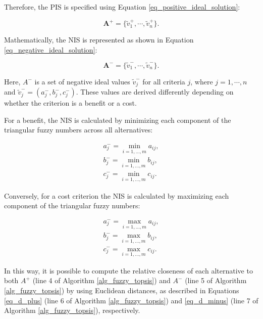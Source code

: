 \documentclass[iicol]{sn-jnl}
\begin{document}
Therefore, the PIS is specified using Equation \eqref{eq_positive_ideal_solution}:

\begin{equation}\label{eq_positive_ideal_solution}
    \mathbf{A^+} = \{ \tilde{v}^+_1, \cdots, \tilde{v}^+_n \}.
\end{equation}

Mathematically, the NIS is represented as shown in Equation \eqref{eq_negative_ideal_solution}:

\begin{equation}\label{eq_negative_ideal_solution}
    \mathbf{A^-} = \{ \tilde{v}^-_1, \cdots, \tilde{v}^-_n \}.
\end{equation}

Here, $A^-$ is a set of negative ideal values $\tilde{v}^-_j$ for all criteria $j$, where $j = 1, \cdots, n$ and $\tilde{v}^-_j = (a^-_{j}, b^-_{j}, c^-_{j})$. These values are derived differently depending on whether the criterion is a benefit or a cost.

For a benefit, the NIS is calculated by minimizing each component of the triangular fuzzy numbers across all alternatives:

\begin{equation}
    \begin{split}
    a^-_{j} = \min_{i=1,\dots,m} a_{ij}, \\
    b^-_{j} = \min_{i=1,\dots,m} b_{ij}, \\
    c^-_{j} = \min_{i=1,\dots,m} c_{ij}.
    \end{split}
\end{equation}

Conversely, for a cost criterion the NIS is calculated by maximizing each component of the triangular fuzzy numbers:

\begin{equation}
    \begin{split}
    a^-_{j} = \max_{i=1,\dots,m} a_{ij}, \\
    b^-_{j} = \max_{i=1,\dots,m} b_{ij}, \\
    c^-_{j} = \max_{i=1,\dots,m} c_{ij}.
    \end{split}
\end{equation}

In this way, it is possible to compute the relative closeness of each alternative to both $A^+$ (line 4 of Algorithm \ref{alg_fuzzy_topsis}) and $A^-$ (line 5 of Algorithm \ref{alg_fuzzy_topsis}) by using Euclidean distances, as described in Equations \ref{eq_d_plus} (line 6 of Algorithm \ref{alg_fuzzy_topsis}) and \ref{eq_d_minus} (line 7 of Algorithm \ref{alg_fuzzy_topsis}), respectively. 
\end{document}
